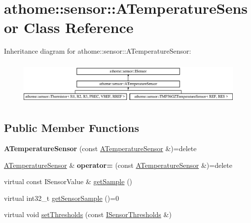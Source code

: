 \hypertarget{classathome_1_1sensor_1_1_a_temperature_sensor}{}\section{athome\+:\+:sensor\+:\+:A\+Temperature\+Sensor Class Reference}
\label{classathome_1_1sensor_1_1_a_temperature_sensor}
Inheritance diagram for athome\+:\+:sensor\+:\+:A\+Temperature\+Sensor\+:\begin{figure}[H]
\begin{center}
\leavevmode
\includegraphics[height=2.204725cm]{classathome_1_1sensor_1_1_a_temperature_sensor}
\end{center}
\end{figure}
\subsection*{Public Member Functions}
\begin{DoxyCompactItemize}
\item 
\mbox{\label{classathome_1_1sensor_1_1_a_temperature_sensor_adc643a183aa4e4ae6b6c8c9212aa6525}} 
{\bfseries A\+Temperature\+Sensor} (const \mbox{\hyperlink{classathome_1_1sensor_1_1_a_temperature_sensor}{A\+Temperature\+Sensor}} \&)=delete
\item 
\mbox{\label{classathome_1_1sensor_1_1_a_temperature_sensor_a0eb5857e7a283d824b183eb55239e9fe}} 
\mbox{\hyperlink{classathome_1_1sensor_1_1_a_temperature_sensor}{A\+Temperature\+Sensor}} \& {\bfseries operator=} (const \mbox{\hyperlink{classathome_1_1sensor_1_1_a_temperature_sensor}{A\+Temperature\+Sensor}} \&)=delete
\item 
virtual const I\+Sensor\+Value \& \mbox{\hyperlink{classathome_1_1sensor_1_1_a_temperature_sensor_afea6a461b8dff9ee736aa508aa4f6a3c}{get\+Sample}} ()
\item 
virtual int32\+\_\+t \mbox{\hyperlink{classathome_1_1sensor_1_1_a_temperature_sensor_a4e5b2c79ab69f6903f7b322da45b0af4}{get\+Sensor\+Sample}} ()=0
\item 
virtual void \mbox{\hyperlink{classathome_1_1sensor_1_1_a_temperature_sensor_a1c323184ac116784e877151895dfd080}{set\+Thresholds}} (const \mbox{\hyperlink{structathome_1_1sensor_1_1_i_sensor_1_1_i_sensor_thresholds}{I\+Sensor\+Thresholds}} \&)
\end{DoxyCompactItemize}
